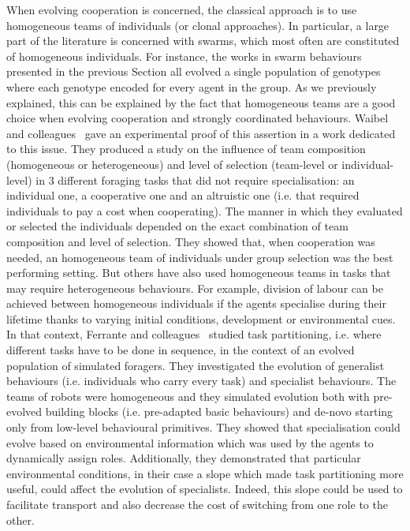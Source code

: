     When evolving cooperation is concerned, the classical approach is to use homogeneous teams of individuals (or clonal approaches). In particular, a large part of the literature is concerned with swarms, which most often are constituted of homogeneous individuals. For instance, the works in swarm behaviours presented in the previous Section all evolved a single population of genotypes where each genotype encoded for every agent in the group. As we previously explained, this can be explained by the fact that homogeneous teams are a good choice when evolving cooperation and strongly coordinated behaviours. Waibel and colleagues~\parencite{Waibel2009} gave an experimental proof of this assertion in a work dedicated to this issue. They produced a study on the influence of team composition (homogeneous or heterogeneous) and level of selection (team-level or individual-level) in $3$ different foraging tasks that did not require specialisation: an individual one, a cooperative one and an altruistic one (i.e. that required individuals to pay a cost when cooperating). The manner in which they evaluated or selected the individuals depended on the exact combination of team composition and level of selection. They showed that, when cooperation was needed, an homogeneous team of individuals under group selection was the best performing setting. But others have also used homogeneous teams in tasks that may require heterogeneous behaviours. For example, division of labour can be achieved between homogeneous individuals if the agents specialise during their lifetime thanks to varying initial conditions, development or environmental cues. In that context, Ferrante and colleagues~\parencite{Ferrante2015} studied task partitioning, i.e. where different tasks have to be done in sequence, in the context of an evolved population of simulated foragers. They investigated the evolution of generalist behaviours (i.e. individuals who carry every task) and specialist behaviours. The teams of robots were homogeneous and they simulated evolution both with pre-evolved building blocks (i.e. pre-adapted basic behaviours) and de-novo starting only from low-level behavioural primitives. They showed that specialisation could evolve based on environmental information which was used by the agents to dynamically assign roles. Additionally, they demonstrated that particular environmental conditions, in their case a slope which made task partitioning more useful, could affect the evolution of specialists. Indeed, this slope could be used to facilitate transport and also decrease the cost of switching from one role to the other.

